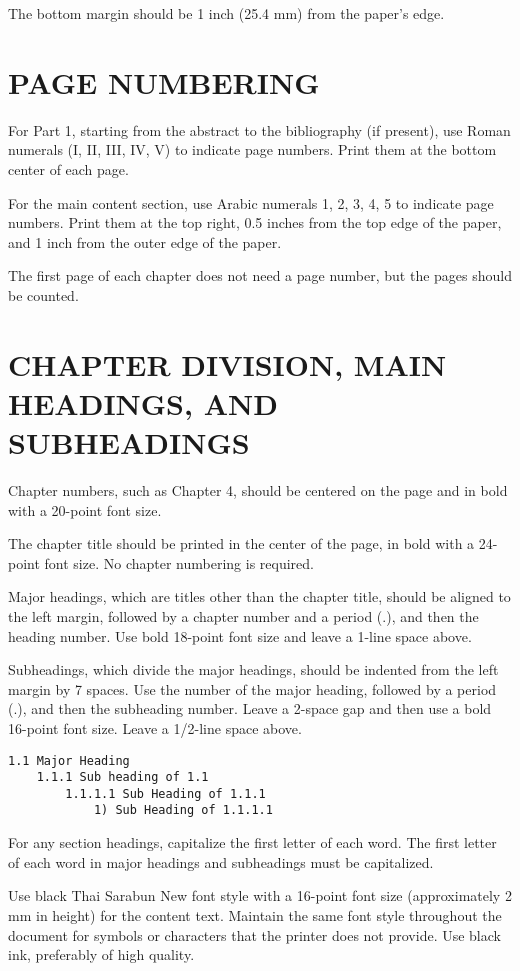 The bottom margin should be 1 inch (25.4 mm) from the paper's edge.

\section{PAGE NUMBERING}

For Part 1, starting from the abstract to the bibliography (if present), use Roman numerals (I, II, III, IV, V) to indicate page numbers. Print them at the bottom center of each page.

For the main content section, use Arabic numerals 1, 2, 3, 4, 5 to indicate page numbers. Print them at the top right, 0.5 inches from the top edge of the paper, and 1 inch from the outer edge of the paper.

The first page of each chapter does not need a page number, but the pages should be counted.

\section{CHAPTER DIVISION, MAIN HEADINGS, AND SUBHEADINGS}

Chapter numbers, such as Chapter 4, should be centered on the page and in bold with a 20-point font size.

The chapter title should be printed in the center of the page, in bold with a 24-point font size. No chapter numbering is required.

Major headings, which are titles other than the chapter title, should be aligned to the left margin, followed by a chapter number and a period (.), and then the heading number. Use bold 18-point font size and leave a 1-line space above.

Subheadings, which divide the major headings, should be indented from the left margin by 7 spaces. Use the number of the major heading, followed by a period (.), and then the subheading number. Leave a 2-space gap and then use a bold 16-point font size. Leave a 1/2-line space above.

\begin{verbatim}
1.1 Major Heading
    1.1.1 Sub heading of 1.1
        1.1.1.1 Sub Heading of 1.1.1
            1) Sub Heading of 1.1.1.1
\end{verbatim}

For any section headings, capitalize the first letter of each word. The first letter of each word in major headings and subheadings must be capitalized.

Use black Thai Sarabun New font style with a 16-point font size (approximately 2 mm in height) for the content text. Maintain the same font style throughout the document for symbols or characters that the printer does not provide. Use black ink, preferably of high quality.

